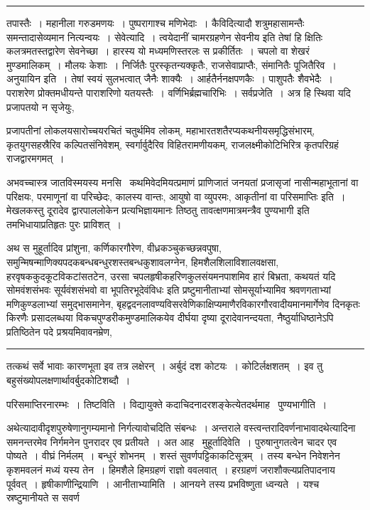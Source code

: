 \documentclass[11pt, openany]{book}
\begin{document}
\vspace{2mm}
\hrule

\noindent
{\s तपास्तैः~। महानीला गरुडमणयः~। पुष्परागाश्च मणिभेदाः~। कैविदित्यादौ शत्रुमहासामन्तैः समन्तादासेव्यमान नित्यन्वयः~। {\qtt सेवेत्यादि}~। त्वयेदानीं चामरग्रहणेन सेवनीय इति तेषां हि क्षितिः कलत्रमतस्तद्वारेण सेवनेच्छा~। {\qt हारस्य यो मध्यमणिस्तरलः स प्रकीर्तितः}~। चपलो वा शेखरं मुण्डमालिकम्~। मौलयः केशाः~। निर्जितैः पुरस्कृतन्यक्कृतैः, राजसेवाप्राप्तैः, संमानितैः पूजितैरिव~। {\qtt अनुयायिन इति}~। तेषां स्वयं सुलभत्वात् जैनैः शाक्यैः~। आर्हतैर्ननक्षपणकैः~। पाशुपतैः शैवभेदैः~। पराशरेण प्रोक्तमधीयन्ते पाराशरिणो यतयस्तैः~। वर्णिभिर्ब्रह्मचारिभिः~। {\qtt सर्वप्रजेति}~। अत्र हि स्थिवा यदि प्रजापतयो न सृजेयुः,}

\newpage

\noindent
प्रजापतीनां लोकलयसारोच्चयरचितं चतुर्थमिव लोकम्, महाभारतशतैरप्यकथनीयसमृद्धिसंभारम्, कृतयुगसहस्रैरिव कल्पितसंनिवेशम्, स्वर्गार्वुदैरिव विहितरामणीयकम्, राजलक्ष्मीकोटिभिरित्र कृतपरिग्रहं राजद्वारमगमत्~।

अभवच्चास्त्र जातविस्मयस्य मनसि \textendash\ कथमिवेदमियत्प्रमाणं प्राणिजातं जनयतां प्रजासृजां नासीन्महाभूतानां वा परिक्षयः, परमाणूनां वा परिच्छेदः, कालस्य वान्तः, आयुषो वा व्युपरमः, आकृतीनां वा परिसमाप्तिः इति~। मेखलकस्तु दूरादेव द्वारपाललोकेन प्रत्यभिज्ञायमानः {\qt तिष्ठतु तावत्क्षणमात्रमन्त्रैव पुण्यभागी} इति तमभिधायाप्रतिहृतः पुरः प्राविशत्~।

अथ स मुहूर्तादिव प्रांशुना, कर्णिकारगौरेण, वीध्रकञ्चुकच्छन्नवपुषा, समुन्मिषन्माणिक्यपदकबन्धबन्धुरशस्तबन्धकुशावलग्नेन, हिमशैलशिलाविशालवक्षसा, हरवृषककुदकूटविकटांसतटेन, उरसा चपलहृषीकहरिणकुलसंयमनपाशमिव हारं बिभ्रता, {\qt कथयतं यदि सोमवंशसंभवः सूर्यवंशसंभवो वा भूपतिरभूदेवंविधः} इति प्रष्टुमानीताभ्यां सोमसूर्याभ्यामिव श्रवणगताभ्यां मणिकुण्डलाभ्यां समुद्भासमानेन, बृहद्वदनलावण्यविसरवेणिकाक्षिप्यमाणैरविकारगौरवादीयमानमार्गेणेव दिनकृतः किरणैः प्रसादलब्धया विकचपुण्डरीकमुण्डमालिकयेव दीर्घया दृष्या दूरादेवानन्दयता, नैष्ठुर्याधिष्ठानेऽपि प्रतिष्ठितेन पदे प्रश्रयमिवावनम्रेण,

\vspace{2mm}
\hrule

\noindent
{\s तत्कथं सर्वे भावाः कारणभूता इव तत्र लक्षेरन्~। अर्बुदं दश कोटयः~। कोटिर्लक्षशतम्~। इव तु बहुसंख्योपलक्षणार्थावर्बुदकोटिशब्दौ~।

परिसमाप्तिरनारम्भः~। {\qtt तिष्टविति}~। विद्यायुक्ते कदाचिदनादरशङ्केत्येतदर्थमाह \textendash\ {\qtt पुण्यभागीति}~।

अथेत्यादावीदृशपुरुषेणानुगम्यमानो निर्गत्यावोचदिति संबन्धः~। अन्तराले वस्त्वन्तरादिवर्णनाभावादथेत्यादिना समनन्तरमेव निर्गमनेन पुनरादर एव प्रतीयते~। अत आह \textendash\ {\qtt मुहूर्तादिवेति}~। पुरुषानुगतत्वेन चादर एव पोष्यते~। वीघ्रं निर्मलम्~। बन्धुरं शोभनम्~। शस्तं सुवर्णपट्टिकाकटिसूत्रम्~। तस्य बन्धेन निवेशनेन कृशमवलनं मध्यं यस्य तेन~। हिमशैले हिमग्रहणं राज्ञो ववलवात्~। हरग्रहणं जराशौक्ल्यप्रतिपादनाय पूर्ववत्~। हृषीकाणीन्द्रियाणि~। {\qtt आनीताभ्यामिति}~। आनयने तस्य प्रभविष्णुता ध्वन्यते~। यश्च स्रष्टुमानीयते स सवर्ण}
\end{document}
